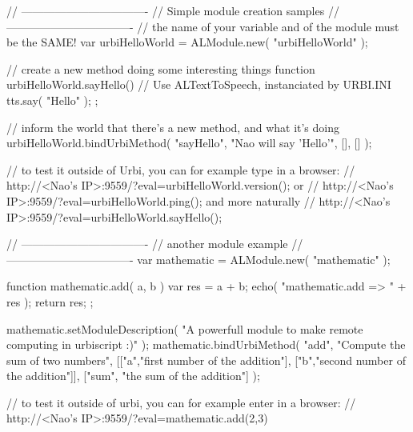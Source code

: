 \begin{urbiunchecked}

// ----------------------------------
// Simple module creation samples
// ----------------------------------
// the name of your variable and of the module must be the SAME!
var urbiHelloWorld = ALModule.new( "urbiHelloWorld" );

// create a new method doing some interesting things
function urbiHelloWorld.sayHello()
{
  // Use ALTextToSpeech, instanciated by URBI.INI
  tts.say( "Hello" );
};

// inform the world that there's a new method, and what it's doing
urbiHelloWorld.bindUrbiMethod( "sayHello", "Nao will say 'Hello'", [], [] );

// to test it outside of Urbi, you can for example type in a browser:
// http://<Nao's IP>:9559/?eval=urbiHelloWorld.version(); or
// http://<Nao's IP>:9559/?eval=urbiHelloWorld.ping(); and more naturally
// http://<Nao's IP>:9559/?eval=urbiHelloWorld.sayHello();

// ----------------------------------
// another module example
// ----------------------------------
var mathematic = ALModule.new( "mathematic" );

function mathematic.add( a, b )
{
  var res = a + b;
  echo( "mathematic.add => " + res );
  return res;
};

mathematic.setModuleDescription(
  "A powerfull module to make remote computing in urbiscript :)" );
mathematic.bindUrbiMethod( "add", "Compute the sum of two numbers",
[["a","first number of the addition"],
["b","second number of the addition"]],
["sum", "the sum of the addition"] );

// to test it outside of urbi, you can for example enter in a browser:
// http://<Nao's IP>:9559/?eval=mathematic.add(2,3)
\end{urbiunchecked}


